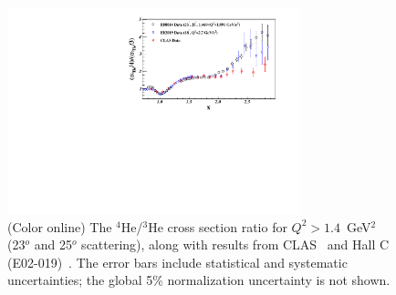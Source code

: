 \documentclass[aps,prl,superscriptaddress,showpacs,twocolumn,floatfix,amsmath,amssymb]{revtex4-1}
\begin{document}


%



%

                \begin{figure}[!ht]
		\begin{center}
		  \includegraphics[width=8.5cm,angle=0]{He4_He3_XS_Ratio}
		\end{center}
		\vspace*{-5mm}
		\caption{(Color online) The $^4$He/$^3$He cross section ratio for $Q^2>1.4$~GeV$^2$ (23$^o$ and 25$^o$ scattering),
                  along with results from CLAS~\cite{PhysRevLett.96.082501} and Hall C (E02-019)~\cite{fomin2012}. The error bars include
                  statistical and systematic uncertainties; the global 5\% normalization uncertainty is not shown.}
		\label{fig:ratios_highqsq}
		\end{figure}
\end{document}
